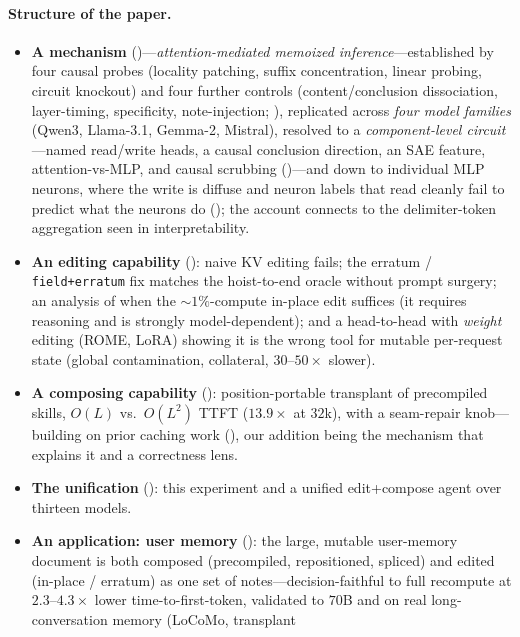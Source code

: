 \paragraph{Structure of the paper.}
\begin{itemize}[leftmargin=1.2em,itemsep=1pt,topsep=2pt]
\item \textbf{A mechanism} ()---\emph{attention-mediated memoized inference}---established
by four causal probes (locality patching, suffix concentration, linear probing, circuit knockout) and four
further controls (content/conclusion dissociation, layer-timing, specificity, note-injection;
), replicated across \emph{four model families} (Qwen3, Llama-3.1, Gemma-2, Mistral),
resolved to a \emph{component-level circuit}---named read/write heads, a causal conclusion direction, an SAE
feature, attention-vs-MLP, and causal scrubbing ()---and down to individual MLP neurons,
where the write is diffuse and neuron labels that read cleanly fail to predict what the neurons do
(); the account connects to the delimiter-token aggregation seen in interpretability.
\item \textbf{An editing capability} (): naive KV editing fails; the erratum /
\texttt{field+erratum} fix matches the hoist-to-end oracle without prompt surgery; an analysis of when
the ${\sim}1\%$-compute in-place edit suffices (it requires reasoning and is strongly
model-dependent); and a head-to-head with \emph{weight}
editing (ROME, LoRA) showing it is the wrong tool for mutable per-request state (global contamination,
collateral, $30$--$50\times$ slower).
\item \textbf{A composing capability} (): position-portable transplant of precompiled
skills, $O(L)$ vs.\ $O(L^2)$ TTFT ($13.9\times$ at $32$k), with a seam-repair knob---building on prior
caching work (), our addition being the mechanism that explains it and a correctness lens.
\item \textbf{The unification} (): this experiment and a unified edit+compose agent over
thirteen models.
\item \textbf{An application: user memory} (): the large, mutable user-memory
document is both composed (precompiled, repositioned, spliced) and edited (in-place / erratum)
as one set of notes---decision-faithful to full recompute at $2.3$--$4.3\times$ lower
time-to-first-token, validated to $70$B and on real long-conversation memory (LoCoMo, transplant

\end{itemize}
